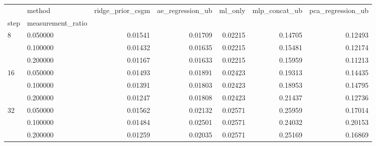 \begin{tabular}{llrrrrr}
\toprule
 & method & ridge_prior_csgm & ae_regression_ub & ml_only & mlp_concat_ub & pca_regression_ub \\
step & measurement_ratio &  &  &  &  &  \\
\midrule
\multirow[t]{3}{*}{8} & 0.050000 & 0.01541 & 0.01709 & 0.02215 & 0.14705 & 0.12493 \\
 & 0.100000 & 0.01432 & 0.01635 & 0.02215 & 0.15481 & 0.12174 \\
 & 0.200000 & 0.01167 & 0.01633 & 0.02215 & 0.15959 & 0.11213 \\
\cline{1-7}
\multirow[t]{3}{*}{16} & 0.050000 & 0.01493 & 0.01891 & 0.02423 & 0.19313 & 0.14435 \\
 & 0.100000 & 0.01391 & 0.01803 & 0.02423 & 0.18953 & 0.14795 \\
 & 0.200000 & 0.01247 & 0.01808 & 0.02423 & 0.21437 & 0.12736 \\
\cline{1-7}
\multirow[t]{3}{*}{32} & 0.050000 & 0.01562 & 0.02132 & 0.02571 & 0.25959 & 0.17014 \\
 & 0.100000 & 0.01484 & 0.02501 & 0.02571 & 0.24032 & 0.20153 \\
 & 0.200000 & 0.01259 & 0.02035 & 0.02571 & 0.25169 & 0.16869 \\
\cline{1-7}
\bottomrule
\end{tabular}
